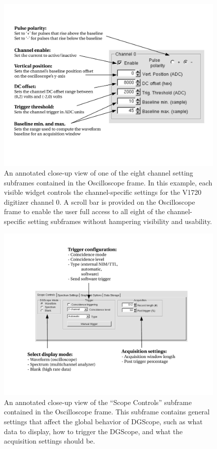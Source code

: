 \begin{figure}
  \centering
  \includegraphics[width=6in]{images/OscilloscopeChannel}
  \caption{An annotated close-up view of one of the eight channel
    setting subframes contained in the Oscilloscope frame. In this
    example, each visible widget controls the channel-specific
    settings for the V1720 digitizer channel 0. A scroll bar is
    provided on the Oscilloscope frame to enable the user full access to
    all eight of the channel-specific setting subframes without
    hampering visibility and usability.}
  \label{fig:channel}
\end{figure}

\begin{figure}
  \centering
  \includegraphics[width=6in]{images/OscilloscopeScope}
  \caption{An annotated close-up view of the ``Scope Controls'' subframe
    contained in the Oscilloscope frame. This subframe contains general
    settings that affect the global behavior of DGScope, such as what
    data to display, how to trigger the DGScope, and what the
    acquisition settings should be.}
  \label{fig:scopesubframe}
\end{figure}

